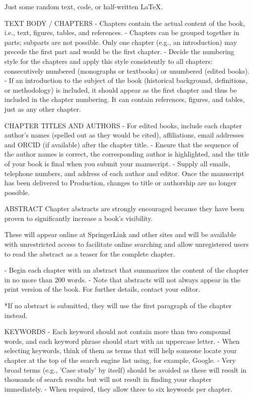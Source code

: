 Just some random text, code, or half-written LaTeX.

TEXT BODY / CHAPTERS
- Chapters contain the actual content of the book, i.e., text, figures, tables, and references.
- Chapters can be grouped together in parts; subparts are not possible. Only one chapter (e.g., an introduction) may precede the first part and would be the first chapter.
- Decide the numbering style for the chapters and apply this style consistently to all chapters: consecutively numbered (monographs or textbooks) or unumbered (edited books).
- If an introduction to the subject of the book (historical background, definitions, or methodology) is included, it should appear as the first chapter and thus be included in the chapter numbering. It can contain references, figures, and tables, just as any other chapter.

CHAPTER TITLES AND AUTHORS
- For edited books, include each chapter author's names (spelled out as they would be cited), affiliations, email addresses and ORCID (if available) after the chapter title.
- Ensure that the sequence of the author names is correct, the corresponding author is highlighted, and the title of your book is final when you submit your manuscript.
- Supply all emails, telephone numbers, and address of each author and editor. Once the manuscript has been delivered to Production, changes to title or authorship are no longer possible.

ABSTRACT
Chapter abstracts are strongly encouraged because they have been proven to significantly increase a book's visibility.

These will appear online at SpringerLink and other sites and will be available with unrestricted access to facilitate online searching and allow unregistered users to read the abstract as a teaser for the complete chapter.

- Begin each chapter with an abstract that summarizes the content of the chapter in no more than 200 words.
- Note that abstracts will not always appear in the print version of the book. For further details, contact your editor.

*If no abstract is submitted, they will use the first paragraph of the chapter instead.

KEYWORDS
- Each keyword should not contain more than two compound words, and each keyword phrase should start with an uppercase letter.
- When selecting keywords, think of them as terms that will help someone locate your chapter at the top of the search engine list using, for example, Google.
- Very broad terms (e.g., 'Case study' by itself) should be avoided as these will result in thousands of search results but will not result in finding your chapter immediately.
- When required, they allow three to six keywords per chapter.

